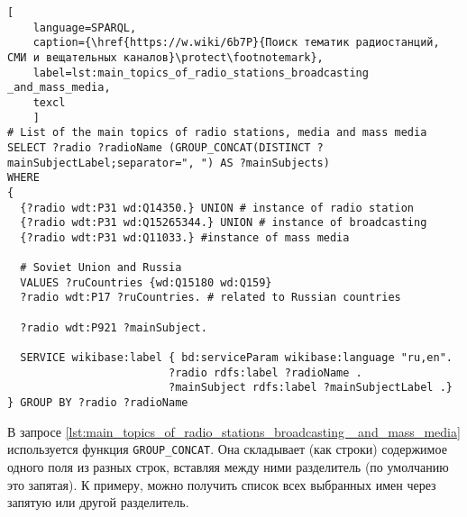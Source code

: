 \begin{lstlisting}[ 
    language=SPARQL,
    caption={\href{https://w.wiki/6b7P}{Поиск тематик радиостанций, СМИ и вещательных каналов}\protect\footnotemark},
    label=lst:main_topics_of_radio_stations_broadcasting _and_mass_media,
    texcl
    ]
# List of the main topics of radio stations, media and mass media
SELECT ?radio ?radioName (GROUP_CONCAT(DISTINCT ?mainSubjectLabel;separator=", ") AS ?mainSubjects) 
WHERE
{
  {?radio wdt:P31 wd:Q14350.} UNION # instance of radio station
  {?radio wdt:P31 wd:Q15265344.} UNION # instance of broadcasting
  {?radio wdt:P31 wd:Q11033.} #instance of mass media
  
  # Soviet Union and Russia
  VALUES ?ruCountries {wd:Q15180 wd:Q159}
  ?radio wdt:P17 ?ruCountries. # related to Russian countries
  
  ?radio wdt:P921 ?mainSubject.
  
  SERVICE wikibase:label { bd:serviceParam wikibase:language "ru,en".
                         ?radio rdfs:label ?radioName .
                         ?mainSubject rdfs:label ?mainSubjectLabel .}
} GROUP BY ?radio ?radioName\end{lstlisting}%


В запросе \ref{lst:main_topics_of_radio_stations_broadcasting _and_mass_media} используется функция \lstinline|GROUP_CONCAT|. Она складывает (как строки) содержимое одного поля из разных строк, вставляя между ними разделитель (по умолчанию это запятая). К примеру, можно получить список всех выбранных имен через запятую или другой разделитель.

\newpage


